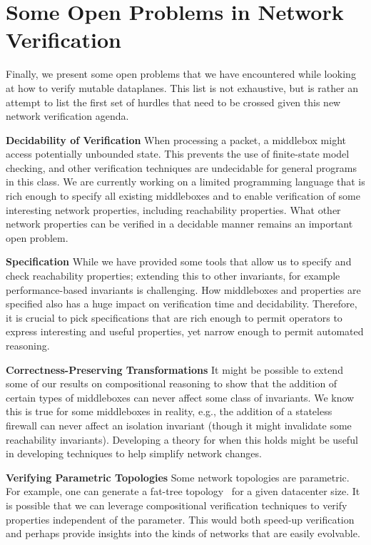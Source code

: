 \section{Some Open Problems in Network Verification}
Finally, we present some open problems that we have encountered while looking at how to verify mutable dataplanes. This list is not 
exhaustive, but is rather an attempt to list the first set of hurdles that need to be crossed given this new network verification agenda.

\noindent\textbf{Decidability of Verification} When processing a packet, a middlebox might access potentially unbounded state. This prevents the use
of finite-state model checking, and other verification techniques are undecidable for general programs in this class. We are
currently working on a limited programming language that is rich enough to specify all existing middleboxes and to enable verification of some interesting network properties, including reachability properties. What other network properties can
be verified in a decidable manner remains an important open problem.

\noindent\textbf{Specification} While we have provided some tools
that allow us to specify and check reachability properties; extending this to other invariants, for example performance-based
invariants is challenging. How middleboxes and properties are specified also has a huge impact on verification time and
decidability. Therefore, it is crucial to pick specifications that are rich enough to permit operators to express interesting and
useful properties, yet narrow enough to permit automated reasoning.

\noindent\textbf{Correctness-Preserving Transformations} It might be possible to extend some of our results on compositional reasoning to show that the addition of certain types of middleboxes
can never affect some class of invariants. We know this is true for some middleboxes in reality, e.g., the addition of a stateless firewall
can never affect an isolation invariant (though it might invalidate some reachability invariants). Developing a theory for when this 
holds might be useful in developing techniques to help simplify network changes. 

\textbf{Verifying Parametric Topologies}
Some network topologies are parametric. For example, one can generate a fat-tree topology~\cite{al2008scalable} for a given datacenter
size. It is possible that we can leverage compositional verification techniques to verify properties independent of the parameter. This
would both speed-up verification and perhaps provide insights into the kinds of networks that are easily evolvable.